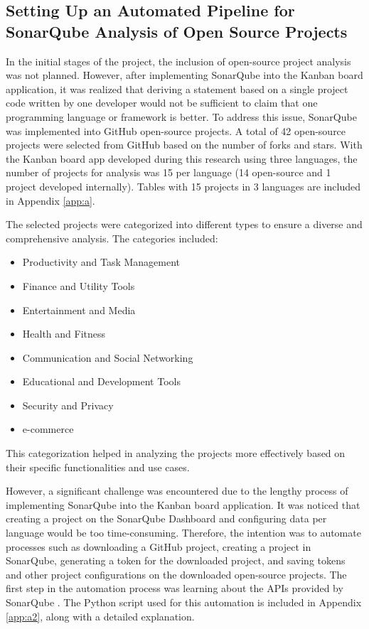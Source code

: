 \subsection{Setting Up an Automated Pipeline for SonarQube Analysis of Open Source Projects}

In the initial stages of the project, the inclusion of open-source project analysis was not planned. However, after implementing SonarQube into the Kanban board application, it was realized that deriving a statement based on a single project code written by one developer would not be sufficient to claim that one programming language or framework is better. To address this issue, SonarQube was implemented into GitHub open-source projects. A total of 42 open-source projects were selected from GitHub based on the number of forks and stars. With the Kanban board app developed during this research using three languages, the number of projects for analysis was 15 per language (14 open-source and 1 project developed internally). Tables with 15 projects in 3 languages are included in Appendix \ref{app:a}.
\par
The selected projects were categorized into different types to ensure a diverse and comprehensive analysis. The categories included:
\begin{itemize}
    \item Productivity and Task Management
    \item Finance and Utility Tools
    \item Entertainment and Media
    \item Health and Fitness
    \item Communication and Social Networking
    \item Educational and Development Tools
    \item Security and Privacy
    \item e-commerce
\end{itemize}
This categorization helped in analyzing the projects more effectively based on their specific functionalities and use cases.
\par
However, a significant challenge was encountered due to the lengthy process of implementing SonarQube into the Kanban board application. It was noticed that creating a project on the SonarQube Dashboard and configuring data per language would be too time-consuming. Therefore, the intention was to automate processes such as downloading a GitHub project, creating a project in SonarQube, generating a token for the downloaded project, and saving tokens and other project configurations on the downloaded open-source projects. The first step in the automation process was learning about the APIs provided by SonarQube \cite{sonarQube}. The Python script used for this automation is included in Appendix \ref{app:a2}, along with a detailed explanation.
